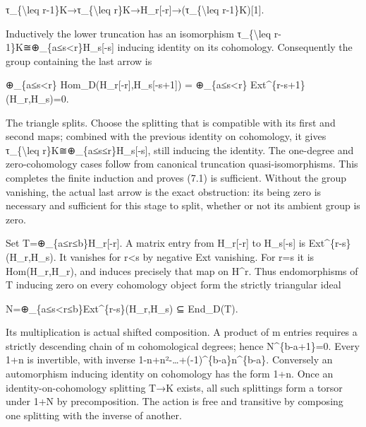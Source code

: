 τ\_\allowbreak{}\{\textbackslash{}leq r-1\}K\allowbreak{}→τ\_\allowbreak{}\{\textbackslash{}leq r\}K\allowbreak{}→H\_\allowbreak{}r[-r]\allowbreak{}\allowbreak{}→(τ\_\allowbreak{}\{\textbackslash{}leq r-1\}K)\allowbreak{}[1]\allowbreak{}.

Inductively the lower truncation has an isomorphism τ\_\allowbreak{}\{\textbackslash{}leq r-1\}K≅\allowbreak{}⊕\_\allowbreak{}\{a≤s<r\}H\_\allowbreak{}s[-s]\allowbreak{} inducing identity on its cohomology. Consequently the group containing the last arrow is

\allowbreak{}⊕\_\allowbreak{}\{a≤s<r\} Hom\_\allowbreak{}D(H\_\allowbreak{}r[-r]\allowbreak{},\allowbreak{}H\_\allowbreak{}s[-s\allowbreak{}+1]\allowbreak{})\allowbreak{} \allowbreak{}= \allowbreak{}⊕\_\allowbreak{}\{a≤s<r\} Ext\textasciicircum{}\{r-s\allowbreak{}+1\}(H\_\allowbreak{}r,\allowbreak{}H\_\allowbreak{}s)\allowbreak{}\allowbreak{}=0.

The triangle splits. Choose the splitting that is compatible with its first and second maps; combined with the previous identity on cohomology,\allowbreak{} it gives τ\_\allowbreak{}\{\textbackslash{}leq r\}K≅\allowbreak{}⊕\_\allowbreak{}\{a≤s≤r\}H\_\allowbreak{}s[-s]\allowbreak{},\allowbreak{} still inducing the identity. The one-degree and zero-cohomology cases follow from canonical truncation quasi-isomorphisms. This completes the finite induction and proves (7.1)\allowbreak{} is sufficient. Without the group vanishing,\allowbreak{} the actual last arrow is the exact obstruction:\allowbreak{} its being zero is necessary and sufficient for this stage to split,\allowbreak{} whether or not its ambient group is zero.

Set T\allowbreak{}=\allowbreak{}⊕\_\allowbreak{}\{a≤r≤b\}H\_\allowbreak{}r[-r]\allowbreak{}. A matrix entry from H\_\allowbreak{}r[-r]\allowbreak{} to H\_\allowbreak{}s[-s]\allowbreak{} is Ext\textasciicircum{}\{r-s\}(H\_\allowbreak{}r,\allowbreak{}H\_\allowbreak{}s)\allowbreak{}. It vanishes for r\textless s by negative Ext vanishing. For r\allowbreak{}=s it is Hom(H\_\allowbreak{}r,\allowbreak{}H\_\allowbreak{}r)\allowbreak{},\allowbreak{} and induces precisely that map on H\^{}r. Thus endomorphisms of T inducing zero on every cohomology object form the strictly triangular ideal

N\allowbreak{}=\allowbreak{}⊕\_\allowbreak{}\{a≤s<r≤b\}Ext\textasciicircum{}\{r-s\}(H\_\allowbreak{}r,\allowbreak{}H\_\allowbreak{}s)\allowbreak{} ⊆ End\_\allowbreak{}D(T)\allowbreak{}.

Its multiplication is actual shifted composition. A product of m entries requires a strictly descending chain of m cohomological degrees; hence N\textasciicircum{}\{b-a\allowbreak{}+1\}\allowbreak{}=0. Every 1\allowbreak{}+n is invertible,\allowbreak{} with inverse 1-n\allowbreak{}+n²-…\allowbreak{}+(-1)\allowbreak{}\textasciicircum{}\{b-a\}n\textasciicircum{}\{b-a\}. Conversely an automorphism inducing identity on cohomology has the form 1\allowbreak{}+n. Once an identity-on-cohomology splitting T\allowbreak{}→K exists,\allowbreak{} all such splittings form a torsor under 1\allowbreak{}+N by precomposition. The action is free and transitive by composing one splitting with the inverse of another.


